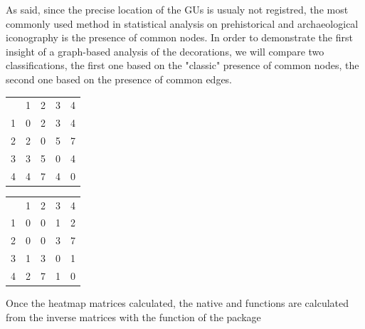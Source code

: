 \documentclass[article]{jss}\usepackage{knitr}
\begin{document}
As said, since the precise location of the GUs is usualy not registred, the most commonly used method in statistical analysis on prehistorical and archaeological iconography is the presence of common nodes. In order to demonstrate the first insight of a graph-based analysis of the decorations, we will compare two classifications, the first one based on the "classic" presence of common nodes, the second one based on the presence of common edges. 

\begin{table}[H]
\begin{minipage}{.45\textwidth}
\centering
\begin{tabular}{rrrrr}
  & 1 & 2 & 3 & 4 \\ 
 1 & 0 & 2 & 3 & 4 \\ 
  2 & 2 & 0 & 5 & 7 \\ 
  3 & 3 & 5 & 0 & 4 \\ 
  4 & 4 & 7 & 4 & 0 \\ 
  \end{tabular}

\end{minipage}
\begin{minipage}{.45\textwidth}
\centering
\begin{tabular}{rrrrr}
  & 1 & 2 & 3 & 4 \\ 
 1 & 0 & 0 & 1 & 2 \\ 
  2 & 0 & 0 & 3 & 7 \\ 
  3 & 1 & 3 & 0 & 1 \\ 
  4 & 2 & 7 & 1 & 0 \\ 
  \end{tabular}

\end{minipage}
\end{table}

Once the heatmap matrices calculated, the native  and  functions \citep{R19} are calculated from the inverse matrices with the function  of the  package \citep{Friendly20}
\end{document}
